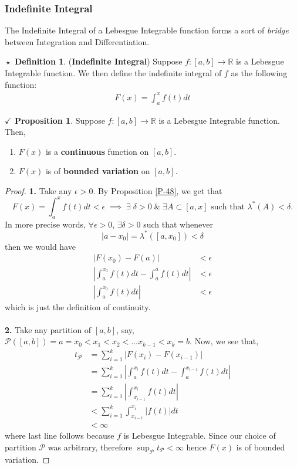 \documentclass{article}
\theoremstyle{definition}
\newtheorem{definition}{$\boxed{\star}$ Definition}
\theoremstyle{remark}
\theoremstyle{definition}
\theoremstyle{definition}
\newtheorem{proposition}{$\checkmark$ Proposition}
\theoremstyle{definition}
\newcommand{\abs}[1]{\left \vert #1\right \vert}
\newcommand{\R}{\mathbb{R}}
\newcommand{\lom}[1]{\lambda^*\left (#1\right )}
\begin{document}
\subsubsection{Indefinite Integral}
The Indefinite Integral of a Lebesgue Integrable function forms a sort of \emph{bridge} between Integration and Differentiation.

\hrulefill
\begin{definition}
	(\textbf{Indefinite Integral}) Suppose $ f : [a,b] \longrightarrow \R $ is a Lebesgue Integrable function. We then define the indefinite integral of $ f $ as the following function:
	\begin{align*}
		F(x) = \int_{a}^{x} f(t) dt
	\end{align*}
\end{definition}
\hrulefill
\begin{proposition}
	Suppose $ f : [a,b]\longrightarrow \R$ is a Lebesgue Integrable function. Then,
	\begin{enumerate}
		\item {$ F(x)  $ is a \textbf{continuous} function on $ [a,b] $.}
		\item {$ F(x) $ is of \textbf{bounded variation} on $ [a,b] $.}
	\end{enumerate}
\end{proposition}
\begin{proof}
	\textbf{1.} Take any $ \epsilon > 0 $. By Proposition \ref{P-48}, we get that 
	\[F(x) = \int_{a}^{x} f(t)dt < \epsilon \;\implies \; \exists\;\delta > 0\;\&\; \exists A \subset [a,x] \text{ such that } \lom{A} < \delta.\]
In more precise words, $ \forall \epsilon > 0 $, $ \exists \delta > 0 $ such that whenever
\[\abs{a-x_0} = \lom{[a,x_0]} < \delta\]
then we would have
\begin{align*}
	\abs{F(x_0) - F(a) } &< \epsilon\\
	\abs{\int_{a}^{x_0} f(t)dt - \int_a^a f(t)dt} &< \epsilon\\
	\abs{\int_{a}^{x_0} f(t) dt} &< \epsilon 
\end{align*}
which is just the definition of continuity.\\\\
\textbf{2.} Take any partition of $ [a,b] $, say, $ \mathcal{P}([a,b]) = a= x_0 < x_1 < x_2 < \dots x_{k-1} < x_k = b$. Now, we see that,
\begin{align*}
	t_{\mathcal{P}} &= \sum_{i=1}^{k} \abs{F(x_i) - F(x_{i-1})} \\
	&= \sum_{i=1}^{k} \abs{\int_{a}^{x_i} f(t) dt - \int_{a}^{x_{i-1}} f(t)dt}\\
	&= \sum_{i=1}^{k} \abs{\int_{x_{i-1}}^{x_{i}} f(t)dt}\\
	&< \sum_{i=1}^{k} \int_{x_{i-1}} ^{x_i} \abs{f(t)} dt\\
	&< \infty 
\end{align*}
where last line follows because $ f $ is Lebesgue Integrable. Since our choice of partition $ \mathcal{P} $ was arbitrary, therefore $ \sup_{\mathcal{P}}t_{\mathcal{P}} < \infty $ hence $ F(x) $ is of bounded variation.
\end{proof}
\end{document}
